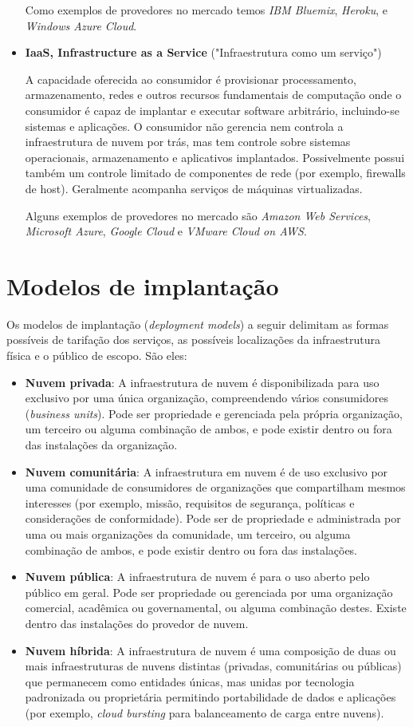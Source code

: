 \begin{itemize}
			Como exemplos de provedores no mercado temos \textit{IBM Bluemix}, \textit{Heroku}, e \textit{Windows Azure Cloud}.
		\item
			\textbf{IaaS, Infrastructure as a Service} ("Infraestrutura como um serviço") 

			A capacidade oferecida ao consumidor é provisionar processamento, armazenamento, redes e outros recursos fundamentais de computação onde o consumidor é capaz de implantar e executar software arbitrário, incluindo-se sistemas e aplicações. O consumidor não gerencia nem controla a infraestrutura de nuvem por trás, mas tem controle sobre sistemas operacionais, armazenamento e aplicativos implantados. Possivelmente possui também um controle limitado de componentes de rede (por exemplo, firewalls de host). Geralmente acompanha serviços de máquinas virtualizadas.

			Alguns exemplos de provedores no mercado são \textit{Amazon Web Services}, \textit{Microsoft Azure}, \textit{Google Cloud} e \textit{VMware Cloud on AWS}. 
	\end{itemize}

\section{Modelos de implantação}
	Os modelos de implantação (\textit{deployment models}) a seguir delimitam as formas possíveis de tarifação dos serviços, as possíveis localizações da infraestrutura física e o público de escopo. São eles:

	\begin{itemize}
		\item
			\textbf{Nuvem privada}: A infraestrutura de nuvem é disponibilizada para uso exclusivo por uma única organização, compreendendo vários consumidores (\textit{business units}). Pode ser propriedade e gerenciada pela própria organização, um terceiro ou alguma combinação de ambos, e pode existir dentro ou fora das instalações da organização.
		\item
			\textbf{Nuvem comunitária}: A infraestrutura em nuvem é de uso exclusivo por uma comunidade de consumidores de organizações que compartilham mesmos interesses (por exemplo, missão, requisitos de segurança, políticas e considerações de conformidade). Pode ser de propriedade e administrada por uma ou mais organizações da comunidade, um terceiro, ou alguma combinação de ambos, e pode existir dentro ou fora das instalações.
		\item
			\textbf{Nuvem pública}: A infraestrutura de nuvem é para o uso aberto pelo público em geral. Pode ser propriedade ou gerenciada por uma organização comercial, acadêmica ou governamental, ou alguma combinação destes. Existe dentro das instalações do provedor de nuvem.
		\item
			\textbf{Nuvem híbrida}: A infraestrutura de nuvem é uma composição de duas ou mais infraestruturas de nuvens distintas (privadas, comunitárias ou públicas) que permanecem como entidades únicas, mas unidas por tecnologia padronizada ou proprietária permitindo portabilidade de dados e aplicações (por exemplo, \textit{cloud bursting} para balanceamento de carga entre nuvens).
	\end{itemize}



